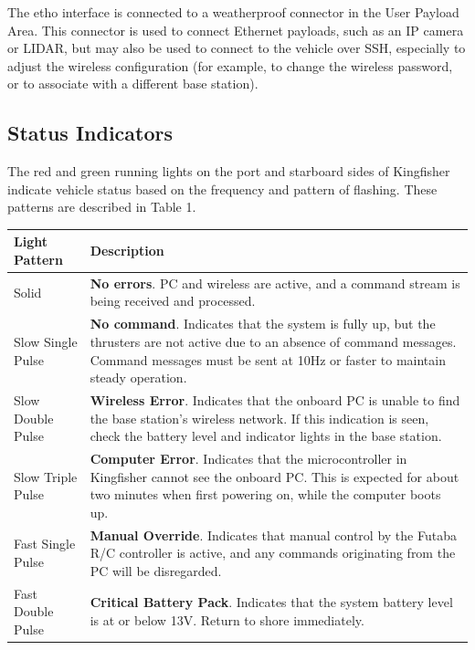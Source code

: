 \documentclass[]{clearpath-latex/clearpath-manual}
\begin{document}
The etho interface is connected to a weatherproof connector in the User Payload Area. This connector is used to connect Ethernet payloads, such as an IP camera or LIDAR, but may also be used to connect to the vehicle over SSH, especially to adjust the wireless configuration (for example, to change the wireless password, or to associate with a different base station).

\subsection{Status Indicators}
The red and green running lights on the port and starboard sides of Kingfisher indicate vehicle status based on the frequency and pattern of flashing. These patterns are described in Table 1.

\bgroup
\def\arraystretch{1.5}%
\begin{table}[h]
\centering
\label{kf-statusindicator}
\begin{tabular}{m{} p{}}
\rowcolor{lightgrey} 
Light Pattern     & Description                                                                                                                                                                                              \\ \hline
Solid             & \textbf{No errors}. PC and wireless are active, and a command stream is being received and processed.                                                                                                             \\ \hline
Slow Single Pulse & \textbf{No command}. Indicates that the system is fully up, but the thrusters are not active due to an absence of command messages. Command messages must be sent at 10Hz or faster to maintain steady operation. \\ \hline
Slow Double Pulse & \textbf{Wireless Error}. Indicates that the onboard PC is unable to find the base station’s wireless network. If this indication is seen, check the battery level and indicator lights in the base station.       \\ \hline
Slow Triple Pulse & \textbf{Computer Error}. Indicates that the microcontroller in Kingfisher cannot see the onboard PC. This is expected for about two minutes when first powering on, while the computer boots up.                  \\ \hline
Fast Single Pulse & \textbf{Manual Override}. Indicates that manual control by the Futaba R/C controller is active, and any commands originating from the PC will be disregarded.                                                     \\ \hline
Fast Double Pulse & \textbf{Critical Battery Pack}. Indicates that the system battery level is at or below 13V. Return to shore immediately. \\ \hline                                                                                        
\end{tabular}
\end{table}
\egroup
\end{document}
